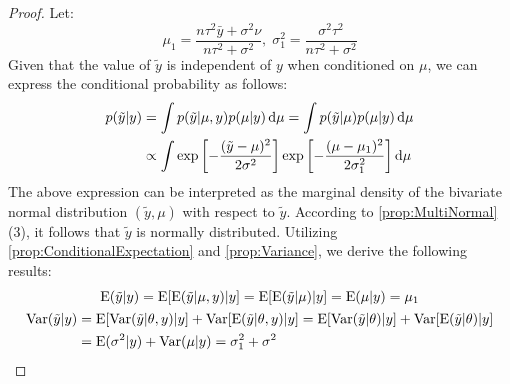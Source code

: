 \begin{proof}
	Let:
	\begin{equation*}
		\mu_1=\frac{n\tau^2\bar{y}+\sigma^2\nu}{n\tau^2+\sigma^2},\;\sigma^2_1=\frac{\sigma^2\tau^2}{n\tau^2+\sigma^2}
	\end{equation*}
	Given that the value of $\tilde{y}$ is independent of $y$ when conditioned on $\mu$, we can express the conditional probability as follows:
	\begin{align*}
		p(\tilde{y}|y)
		&=\int p(\tilde{y}|\mu,y)p(\mu|y)\mathop{}\!\mathrm{d}\mu=\int p(\tilde{y}|\mu)p(\mu|y)\mathop{}\!\mathrm{d}\mu \\
		&\propto\int\exp\left[-\frac{(\tilde{y}-\mu)^2}{2\sigma^2}\right]\exp\left[-\frac{(\mu-\mu_1)^2}{2\sigma_1^2}\right]\mathop{}\!\mathrm{d}\mu	
	\end{align*}
	The above expression can be interpreted as the marginal density of the bivariate normal distribution $(\tilde{y}, \mu)$ with respect to $\tilde{y}$. According to \cref{prop:MultiNormal}(3), it follows that $\tilde{y}$ is normally distributed. Utilizing \cref{prop:ConditionalExpectation} and \cref{prop:Variance}, we derive the following results:
	\begin{gather*}
		\operatorname{E}(\tilde{y}|y)=\operatorname{E}[\operatorname{E}(\tilde{y}|\mu,y)|y]=\operatorname{E}[\operatorname{E}(\tilde{y}|\mu)|y]=\operatorname{E}(\mu|y)=\mu_1 \\
		\begin{aligned}
			\operatorname{Var}(\tilde{y}|y)&=\operatorname{E}[\operatorname{Var}(\tilde{y}|\theta,y)|y]+\operatorname{Var}[\operatorname{E}(\tilde{y}|\theta,y)|y]=\operatorname{E}[\operatorname{Var}(\tilde{y}|\theta)|y]+\operatorname{Var}[\operatorname{E}(\tilde{y}|\theta)|y] \\
			&=\operatorname{E}(\sigma^2|y)+\operatorname{Var}(\mu|y)=\sigma_1^2+\sigma^2
		\end{aligned}\qedhere
	\end{gather*}
\end{proof}
